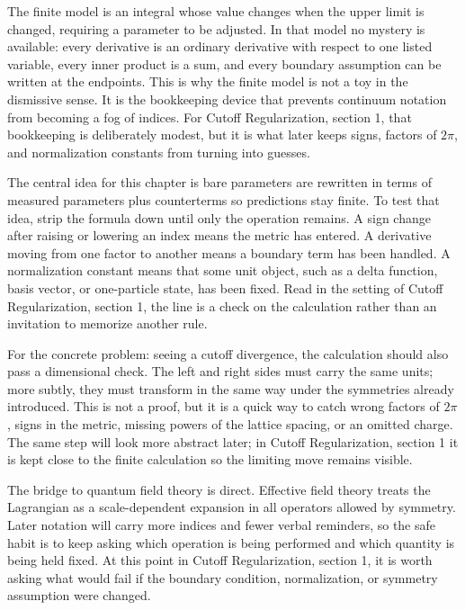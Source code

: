 The finite model is an integral whose value changes when the upper limit is changed, requiring a parameter to be adjusted.  In that model no mystery is available: every derivative is an ordinary derivative with respect to one listed variable, every inner product is a sum, and every boundary assumption can be written at the endpoints.  This is why the finite model is not a toy in the dismissive sense.  It is the bookkeeping device that prevents continuum notation from becoming a fog of indices.  For Cutoff Regularization, section 1, that bookkeeping is deliberately modest, but it is what later keeps signs, factors of \(2\pi\), and normalization constants from turning into guesses.

The central idea for this chapter is bare parameters are rewritten in terms of measured parameters plus counterterms so predictions stay finite.  To test that idea, strip the formula down until only the operation remains.  A sign change after raising or lowering an index means the metric has entered.  A derivative moving from one factor to another means a boundary term has been handled.  A normalization constant means that some unit object, such as a delta function, basis vector, or one-particle state, has been fixed.  Read in the setting of Cutoff Regularization, section 1, the line is a check on the calculation rather than an invitation to memorize another rule.

For the concrete problem: seeing a cutoff divergence, the calculation should also pass a dimensional check.  The left and right sides must carry the same units; more subtly, they must transform in the same way under the symmetries already introduced.  This is not a proof, but it is a quick way to catch wrong factors of \(2\pi\), signs in the metric, missing powers of the lattice spacing, or an omitted charge.  The same step will look more abstract later; in Cutoff Regularization, section 1 it is kept close to the finite calculation so the limiting move remains visible.

The bridge to quantum field theory is direct.  Effective field theory treats the Lagrangian as a scale-dependent expansion in all operators allowed by symmetry.  Later notation will carry more indices and fewer verbal reminders, so the safe habit is to keep asking which operation is being performed and which quantity is being held fixed.  At this point in Cutoff Regularization, section 1, it is worth asking what would fail if the boundary condition, normalization, or symmetry assumption were changed.

